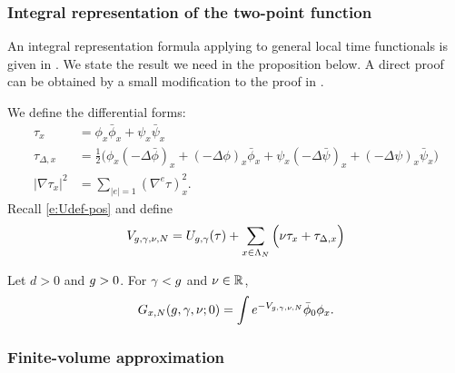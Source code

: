 \subsubsection{Integral representation of the two-point function}
\label{sec:Gintrep}

An integral representation formula applying to general local time functionals
is given in \cite{BEI92,BIS09}. We state the result we need in the proposition below.
A direct proof can be obtained by a small modification to the proof in
\cite[Appendix~A]{ST-phi4}.

We define the differential forms:
\begin{align}
\label{e:taudef}
\tau_x
	&=
\phi_x \bar\phi_x + \psi_x \bar\psi_x
	\\
\label{e:addDelta}
\tau_{\Delta,x}
	&=
\frac 12
\Big(
	\phi_{x} (- \Delta \bar{\phi})_{x} + (- \Delta \phi)_{x} \bar{\phi}_{x}
		+
	\psi_{x}  (- \Delta \bar{\psi})_{x} + (- \Delta \psi)_{x}  \bar{\psi}_{x}
\Big)
	\\
\label{e:nablatau}
|\nabla \tau_x|^2
	&=
\sum_{|e|=1} (\nabla^e \tau)_x^2.
\end{align}
Recall \eqref{e:Udef-pos} and define
\begin{equation}
\label{e:Vdef2}
V_{g,\gamma,\nu,N}
	=
U_{g,\gamma}(\tau)
	+
\sum_{x\in\Lambda_N}
\Big(
	\nu \tau_x + \tau_{\Delta,x}
\Big)
\end{equation}

\begin{prop}
Let $d > 0$ and $g > 0$. For $\gamma < g$ and $\nu \in {\mathbb R}$,
\begin{equation}
\label{e:Grep-pos-bis}
G_{x,N}(g, \gamma, \nu; 0)
	=
\int e^{-V_{g,\gamma,\nu,N}} \bar\phi_0 \phi_x.
\end{equation}
\end{prop}

\subsubsection{Finite-volume approximation}

